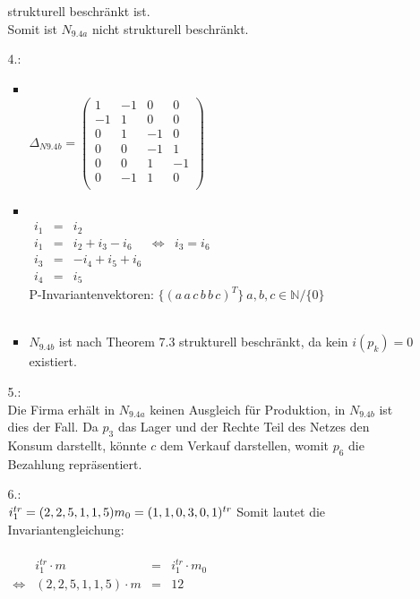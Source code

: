 \documentclass[a4paper,11pt,fleqn]{scrartcl}
\begin{document}
\begin{enumerate}
\begin{enumerate}
				strukturell beschränkt ist. \\
				Somit ist \(N_{9.4a}\) nicht strukturell beschränkt.
			\item[4.:]\quad \\
			\begin{itemize}
				\item \quad \\
				\( \Delta_{N9.4b} =
			\begin{pmatrix}
				1 & -1 & 0 & 0 \\
				-1 & 1 & 0 & 0 \\
				0 & 1 & -1 & 0 \\
				0 & 0 & -1 & 1 \\
				0 & 0 & 1 & -1 \\
				0 & -1 & 1 & 0 \\
			\end{pmatrix}
			\) \\
			\item \quad \\
			\(\begin{array}{rclcl}
				i_1 &=& i_2 \\
				i_1 &=& i_2 + i_3 - i_6 &\Leftrightarrow & i_3 = i_6 \\
				i_3 &=& -i_4 + i_5 + i_6 \\
				i_4 &=& i_5
			\end{array}
			\) \\
			P-Invariantenvektoren: \(\Big\{(a\,a\,c\,b\,b\,c)^T\Big\}\ a,b,c\in\mathbb{N}/\{0\}\) \\ \\
			\item \(N_{9.4b}\) ist nach Theorem 7.3 strukturell beschränkt, da kein \(i(p_k) = 0\) existiert. \\
			
			\end{itemize}
			\item[5.:]\quad \\
			Die Firma erhält in \(N_{9.4a}\) keinen Ausgleich für Produktion, in \(N_{9.4b}\) ist dies der Fall.
			Da \(p_3\) das Lager und der Rechte Teil des Netzes den Konsum darstellt, könnte \(c\) dem Verkauf 
			darstellen, womit \(p_6\) die Bezahlung repräsentiert.
			\item[6.:]\quad \\
			\(
				i_1^{tr} = (2,2,5,1,1,5) \\
				m_0 = (1,1,0,3,0,1)^{tr} \\
				\\
			\)
			Somit lautet die Invariantengleichung: \\
			\\
			\(
			\begin{array}{crcr}
				& i_1^{tr} \cdot m &=& i_1^{tr} \cdot m_0 \\
				\Leftrightarrow & (2,2,5,1,1,5) \cdot m &=& 12
			\end{array}
			\)
		\end{enumerate}
	\end{enumerate}
\end{document}
